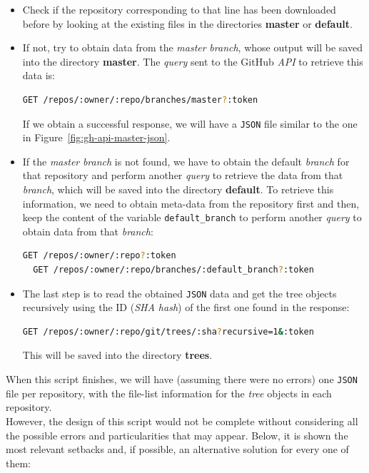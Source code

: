 \documentclass[a4paper, 12pt]{book}
\begin{document}
\begin{itemize}
  \item Check if the repository corresponding to that line has been downloaded before by looking at the existing files
  in the directories \textbf{master} or \textbf{default}.
  \item If not, try to obtain data from the \emph{master} \textit{branch}, whose output will be saved into the directory
  \textbf{master}.
  The \textit{query} sent to the GitHub \textit{API} to retrieve this data is:
  \begin{lstlisting}[language=bash]
  GET /repos/:owner/:repo/branches/master?:token \end{lstlisting}
  If we obtain a successful response, we will have a \texttt{JSON} file similar to the one in Figure~\ref{fig:gh-api-master-json}.
  \item If the \emph{master} \textit{branch} is not found, we have to obtain the default \textit{branch} for that repository and
  perform another \textit{query} to retrieve the data from that \textit{branch}, which will be saved into the directory \textbf{default}.
  To retrieve this information, we need to obtain meta-data from the repository first and then, keep the content
  of the variable \texttt{default\_branch} to perform another \textit{query} to obtain data from that \textit{branch}:
  \begin{lstlisting}[language=bash]
  GET /repos/:owner/:repo?:token
  GET /repos/:owner/:repo/branches/:default_branch?:token \end{lstlisting}
  \item The last step is to read the obtained \texttt{JSON} data and get the tree objects recursively using the ID
  (\textit{SHA hash}) of the first one found in the response:
  \begin{lstlisting}[language=bash]
  GET /repos/:owner/:repo/git/trees/:sha?recursive=1&:token \end{lstlisting}
  This will be saved into the directory \textbf{trees}.
\end{itemize}
When this script finishes, we will have (assuming there were no errors) one \texttt{JSON} file per repository,
with the file-list information for the \textit{tree} objects in each repository.\\
However, the design of this script would not be complete without considering all the possible errors and
particularities that may appear. Below, it is shown the most relevant setbacks and, if possible, an alternative
solution for every one of them:
\end{document}
